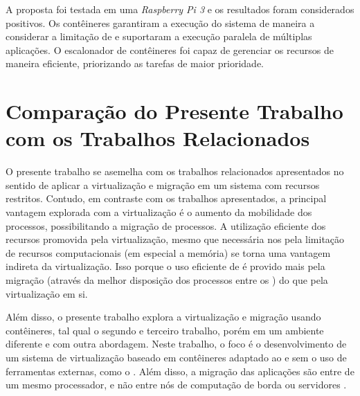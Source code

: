 A proposta foi testada em uma \textit{Raspberry Pi 3} e os resultados foram considerados positivos. Os contêineres garantiram a execução do sistema de maneira a considerar a limitação de \hardware e suportaram a execução paralela de múltiplas aplicações. O escalonador de contêineres foi capaz de gerenciar os recursos de maneira eficiente, priorizando as tarefas de maior prioridade.

\section{Comparação do Presente Trabalho com os Trabalhos Relacionados}

O presente trabalho se asemelha com os trabalhos relacionados apresentados no sentido de aplicar a virtualização e migração em um sistema com recursos restritos. Contudo, em contraste com os trabalhos apresentados, a principal vantagem explorada com a virtualização é o aumento da mobilidade dos processos, possibilitando a migração de processos. A utilização eficiente dos recursos promovida pela virtualização, mesmo que necessária nos \lws pela limitação de recursos computacionais (em especial a memória) se torna uma vantagem indireta da virtualização. Isso porque o uso eficiente de \hardware é provido mais pela migração (através da melhor disposição dos processos entre os \clusters) do que pela virtualização em si.

Além disso, o presente trabalho explora a virtualização e migração usando contêineres, tal qual o segundo e terceiro trabalho, porém em um ambiente diferente e com outra abordagem. Neste trabalho, o foco é o desenvolvimento de um sistema de virtualização baseado em contêineres adaptado ao \so e sem o uso de ferramentas externas, como o \docker. Além disso, a migração das aplicações são entre \clusters de um mesmo processador, e não entre nós de computação de borda ou servidores \cloud.





